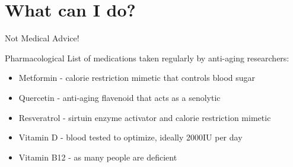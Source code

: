 \section{What can I do?}


\addtocounter{framenumber}{1}
\begin{frame}[standout]
    Not Medical Advice!
\end{frame}

\begin{frame}[c]{Pharmacological}
    List of medications taken regularly by anti-aging researchers:

    \begin{itemize}[<+(1)->]
        \item Metformin - calorie restriction mimetic that controls blood sugar
        \item Quercetin - anti-aging flavenoid that acts as a senolytic
        \item Resveratrol - sirtuin enzyme activator and calorie restriction mimetic
        \item Vitamin D - blood tested to optimize, ideally 2000IU per day
        \item Vitamin B12 - as many people are deficient
    \end{itemize}


\end{frame}
